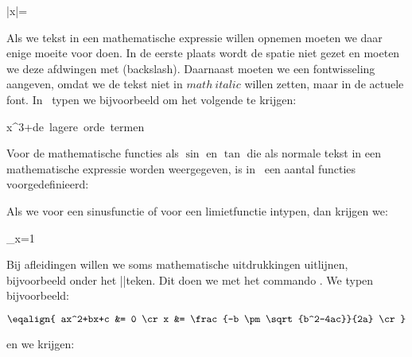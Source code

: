 \startformule
|x|=
\stopformule
\stop

Als we tekst in een mathematische expressie willen opnemen
moeten we daar enige moeite voor doen. In de eerste plaats
wordt de spatie niet gezet en moeten we deze afdwingen met
\type{ \ } (backslash). Daarnaast moeten we een
fontwisseling aangeven, omdat we de tekst niet in $math\
italic$ willen zetten, maar in de actuele font. In \CONTEXT\
typen we bijvoorbeeld  om het volgende te krijgen:

\startformule
x^3+{\tf de\ lagere\ orde\ termen}
\stopformule

Voor de mathematische functies als $\sin$ en $\tan$ die als
normale tekst in een mathematische expressie worden
weergegeven, is in \TEX\ een aantal functies
voorgedefinieerd:

\starttabulatie[|l|l|l|l|l|l|l|l|]
\NC \type{\arccos} \NC \type{\cos} \NC \type{\csc} \NC \type{\exp} \NC \type{\ker} \NC \type{\limsup} \NC \type{\min} \NC \type{\sinh} \NC\NR
\NC \type{\arcsin} \NC \type{\cosh} \NC \type{\deg} \NC \type{\gcd} \NC \type{\lg} \NC \type{\ln} \NC \type{\Pr} \NC \type{\sup} \NC\NR
\NC \type{\arctan} \NC \type{\cot} \NC \type{\det} \NC \type{\hom} \NC \type{\lim} \NC \type{\log} \NC \type{\sec} \NC \type{\tan} \NC\NR
\NC \type{\arg} \NC \type{\coth} \NC \type{\dim} \NC \type{\inf} \NC \type{\liminf} \NC \type{\max} \NC \type{\sin} \NC \type{\tanh} \NC\NR
\stoptabulatie

Als we voor een sinusfunctie
\type {$$\sin 2\theta=2\sin\theta\cos\theta$$}
of voor een limietfunctie
 intypen,
dan krijgen we:

\startformule
{}\sin\theta\cos\theta
{} \quad
\lim_{x\to0}{}=1
\stopformule

Bij afleidingen willen we soms mathematische uitdrukkingen
uitlijnen, bijvoorbeeld onder het \citeer{$=$}||teken. Dit
doen we met het commando \type{\eqalign}. We typen
bijvoorbeeld:

\startbuffer
$$\eqalign{
      ax^2+bx+c &= 0                                \cr
              x &= \frac{-b \pm \sqrt{b^2-4ac}}{2a} \cr}$$
\stopbuffer

\typebuffer

en we krijgen:

\startformule
{}
\stopformule

